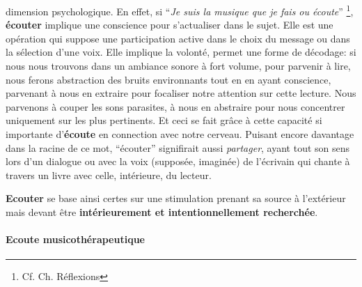 dimension psychologique.
En effet, si \enquote{\emph{Je suis la musique que je fais ou écoute}}
\autocite{viret:b}\footnote{Cf. Ch. Réflexions}, \textbf{écouter} implique une conscience pour s'actualiser dans le sujet.
Elle est une opération
qui suppose une participation active dans le choix du message
ou dans la sélection d'une voix. Elle  implique la volonté,
permet une forme de décodage:
si nous nous trouvons dans un ambiance sonore à fort volume, pour
parvenir à lire, nous
ferons abstraction des bruits environnants tout en en ayant
conscience, parvenant à nous en extraire pour focaliser notre
attention sur cette lecture. Nous parvenons à couper les sons parasites, à nous en abstraire pour
nous concentrer uniquement sur les plus  pertinents. Et ceci se fait grâce à cette capacité si importante
d'\textbf{écoute} en connection avec notre cerveau.
Puisant encore davantage dans  la racine de ce mot, ``écouter'' signifirait
aussi \emph{partager}, ayant tout son sens lors d'un dialogue ou
avec la voix (supposée, imaginée) de  l'écrivain qui
 chante à travers un livre avec celle, intérieure, du lecteur.


  \textbf{Ecouter} se base ainsi certes sur une stimulation prenant sa source à
l'extérieur mais devant être \textbf{ intérieurement et intentionnellement
	recherchée}.




      \paragraph{Ecoute musicothérapeutique}



